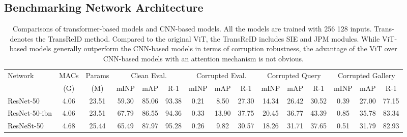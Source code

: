\subsection{Benchmarking Network Architecture}

\setlength{\tabcolsep}{3.2pt}
\begin{table}[t]
    \scriptsize
    \renewcommand\arraystretch{1.5}
    \centering
    \caption{Comparisons of transformer-based models and CNN-based models. All the models are trained with 256  128 inputs. Trans- denotes the TransReID method. Compared to the original ViT, the TransReID includes SIE and JPM modules. While ViT-based models generally outperform the CNN-based models in terms of corruption robustness, the advantage of the ViT over CNN-based models with an attention mechanism is not obvious.}
    \vspace{1mm}
    \begin{tabular}{l|cc|ccc|ccc|ccc|ccc}
        \hline
        \multirow{2}{*}{Network} & MACs  & Params & \multicolumn{3}{c|}{Clean Eval.} & \multicolumn{3}{c|}{Corrupted Eval.} & \multicolumn{3}{c|}{Corrupted Query} & \multicolumn{3}{c}{Corrupted Gallery}                                                                                                                                        \\
                                 & (G)   & (M)    & mINP                             & mAP                                  & R-1                                  & mINP                                  & mAP            & R-1            & mINP           & mAP            & R-1            & mINP          & mAP            & R-1            \\
        \hline
        ResNet-50                & 4.06  & 23.51  & 59.30                            & 85.06                                & 93.38                                & 0.21                                  & 8.50           & 27.30          & 14.34          & 26.42          & 30.52          & 0.39          & 27.00          & 77.15          \\
        ResNet-50-ibn            & 4.06  & 23.51  & 67.79                            & 86.55                                & 94.36                                & 0.33                                  & 13.90          & 37.75          & 20.45          & 36.77          & 43.39          & 0.85          & 35.78          & 83.34          \\
        ResNeSt-50               & 4.68  & 25.44  & 65.49                            & 87.97                                & 95.28                                & 0.26                                  & 9.82           & 30.57          & 18.26          & 31.71          & 37.65          & 0.51          & 31.79          & 82.93          \\

\end{tabular}
\end{table}

